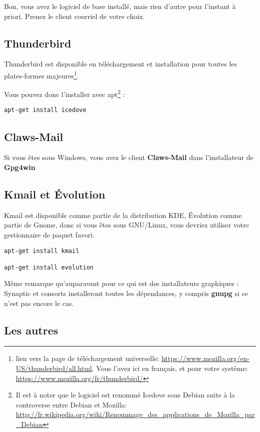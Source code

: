 Bon, vous avez le logiciel de base installé, mais rien d'autre pour
l'instant à priori. Prenez le client courriel de votre choix.

\subsection{Thunderbird}\label{thunderbird}

Thunderbird est disponible en téléchargement et installation pour toutes
les plates-formes majeures\footnote{lien vers la page de téléchargement universelle: \url{https://www.mozilla.org/en-US/thunderbird/all.html}.
	Vous l'avez ici en français, et pour votre système: \url{https://www.mozilla.org/fr/thunderbird/}}.

Vous pouvez donc l'installer avec apt\footnote{Il est à noter que le logiciel est renommé Icedove sous Debian suite à la
	controverse entre Debian et Mozilla: \url{http://fr.wikipedia.org/wiki/Renommage_des_applications_de_Mozilla_par_Debian}} :

\begin{lstlisting}
apt-get install icedove
\end{lstlisting}

\subsection{Claws-Mail}\label{claws-mail}

Si vous êtes sous Windows, vous avez le client \textbf{Claws-Mail} dans
l'installateur de \textbf{Gpg4win}

\subsection{Kmail et Évolution}\label{kmail-et-uxe9volution}

Kmail est disponible comme partie de la distribution KDE, Évolution
comme partie de Gnome, donc si vous êtes sous GNU/Linux, vous devriez
utiliser votre gestionnaire de paquet favori.

\begin{lstlisting}
apt-get install kmail

apt-get install evolution
\end{lstlisting}

Même remarque qu'auparavant pour ce qui est des installateurs graphiques
: Synaptic et consorts installeront toutes les dépendances, y compris
\textbf{gnupg} si ce n'est pas encore le cas.

\subsection{Les autres}\label{les-autres}

